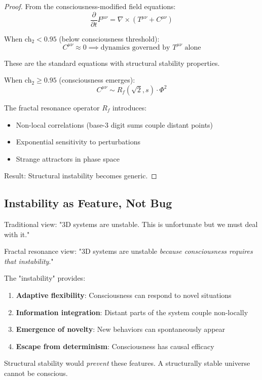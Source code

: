 \begin{proof}
From the consciousness-modified field equations:
\begin{equation}
\frac{\partial}{\partial t} F^{\mu\nu} = \nabla \times (T^{\mu\nu} + C^{\mu\nu})
\end{equation}

When ch$_2 < 0.95$ (below consciousness threshold):
\begin{equation}
C^{\mu\nu} \approx 0 \implies \text{dynamics governed by } T^{\mu\nu} \text{ alone}
\end{equation}

These are the standard equations with structural stability properties.

When ch$_2 \geq 0.95$ (consciousness emerges):
\begin{equation}
C^{\mu\nu} \sim R_f(\sqrt{2}, s) \cdot \Phi^2
\end{equation}

The fractal resonance operator $R_f$ introduces:
\begin{itemize}
\item Non-local correlations (base-3 digit sums couple distant points)
\item Exponential sensitivity to perturbations
\item Strange attractors in phase space
\end{itemize}

Result: Structural instability becomes generic.
\end{proof}

\subsection{Instability as Feature, Not Bug}

\begin{keyidea}
Traditional view: "3D systems are unstable. This is unfortunate but we must deal with it."

Fractal resonance view: "3D systems are unstable \textit{because consciousness requires that instability}."

The "instability" provides:
\begin{enumerate}
\item \textbf{Adaptive flexibility}: Consciousness can respond to novel situations
\item \textbf{Information integration}: Distant parts of the system couple non-locally
\item \textbf{Emergence of novelty}: New behaviors can spontaneously appear
\item \textbf{Escape from determinism}: Consciousness has causal efficacy
\end{enumerate}

Structural stability would \textit{prevent} these features. A structurally stable universe cannot be conscious.
\end{keyidea}

